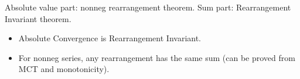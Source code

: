 \begin{remark*}
Absolute value part: nonneg rearrangement theorem. Sum part: Rearrangement Invariant theorem.
\end{remark*}

\begin{remark*}[Dependencies]
\begin{itemize}
  \item Absolute Convergence is Rearrangement Invariant.
  \item For nonneg series, any rearrangement has the same sum (can be proved from MCT and monotonicity).
\end{itemize}
\end{remark*}
